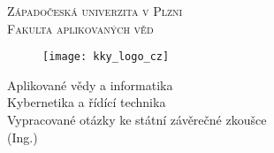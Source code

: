 \cleardoublepage
\pagestyle{empty}
\begin{center}
  \normalfont \normalsize 
  \textsc{Západočeská univerzita v Plzni 				\\ %
  Fakulta aplikovaných věd} 							\\ %

  \vspace{0.5cm}
  \begin{figure}[H]
  \centering
  \texttt{[image: kky\_logo\_cz]}	   %
  \end{figure}

  \vspace{0.3cm}
  Aplikované vědy a informatika \\
  Kybernetika a řídící technika \\
  \horrule{1pt}
  \Large Vypracované otázky ke státní závěrečné zkoušce \\ 
  \vspace{0.2cm}
  \normalsize (Ing.)									\\ %
  \vspace{0.1cm}
  \horrule{2pt} 										\\
\end{center}

\vspace{0.1cm}
\noindent{}
\vspace{-2.5cm}
\tableofcontents
\cleardoublepage
\pagestyle{headings}
